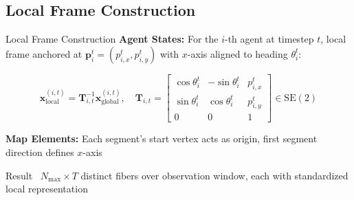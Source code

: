\documentclass[10pt,aspectratio=169]{beamer}
\begin{document}
\subsection{Local Frame Construction}

\begin{frame}{Local Frame Construction}
\textbf{Agent States:} For the $i$-th agent at timestep $t$, local frame anchored at $\mathbf{p}_i^t = (p_{i,x}^t, p_{i,y}^t)$ with $x$-axis aligned to heading $\theta_i^t$:

\begin{equation}
\mathbf{x}^{(i,t)}_{\text{local}} = \mathbf{T}_{i,t}^{-1} \mathbf{x}_{\text{global}}^{(i,t)}, \quad
\mathbf{T}_{i,t} = \begin{bmatrix}
\cos\theta_i^t & -\sin\theta_i^t & p_{i,x}^t \\
\sin\theta_i^t & \cos\theta_i^t & p_{i,y}^t \\
0 & 0 & 1
\end{bmatrix} \in \mathrm{SE}(2)
\end{equation}

\vspace{0.3cm}

\textbf{Map Elements:} Each segment's start vertex acts as origin, first segment direction defines $x$-axis

\begin{block}{Result~\cite{qcnetZhou2023}}
$N_{\max} \times T$ distinct fibers over observation window, each with standardized local representation
\end{block}
\end{frame}
\end{document}
